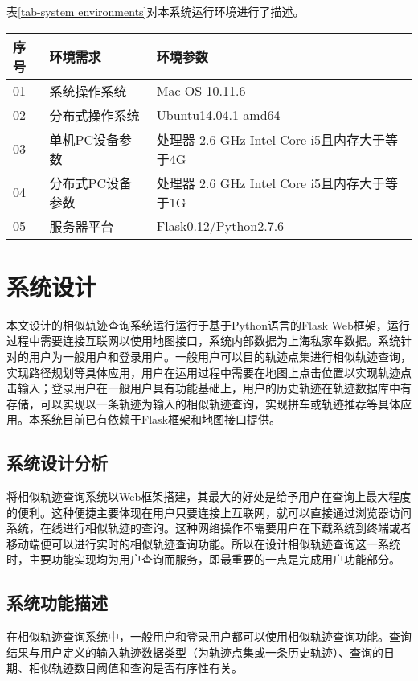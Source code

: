 表\ref{tab-system environments}对本系统运行环境进行了描述。
\begin{table}[!htpb]
  	\centering
		\begin{tabular}{ |p{1cm}|p{3.5cm}|p{8.5cm}| }
		\hline
		序号 & 环境需求 & 环境参数 \\
		\hline
		01 & 系统操作系统 & Mac OS 10.11.6  \\
		\hline
		02 & 分布式操作系统 & Ubuntu14.04.1 amd64  \\
		\hline
		03 & 单机PC设备参数 & 处理器 2.6 GHz Intel Core i5且内存大于等于4G\\
		\hline
		04 & 分布式PC设备参数 & 处理器 2.6 GHz Intel Core i5且内存大于等于1G\\
		\hline
		05 & 服务器平台 & Flask0.12/Python2.7.6 \\
		\hline
		\end{tabular}
\end{table}


\section{系统设计}
\label{sec:overall description}
本文设计的相似轨迹查询系统运行运行于基于Python语言的Flask Web框架，运行过程中需要连接互联网以使用地图接口，系统内部数据为上海私家车数据。系统针对的用户为一般用户和登录用户。一般用户可以目的轨迹点集进行相似轨迹查询，实现路径规划等具体应用，用户在运用过程中需要在地图上点击位置以实现轨迹点击输入；登录用户在一般用户具有功能基础上，用户的历史轨迹在轨迹数据库中有存储，可以实现以一条轨迹为输入的相似轨迹查询，实现拼车或轨迹推荐等具体应用。本系统目前已有依赖于Flask框架和地图接口提供。

\subsection{系统设计分析}
\label{subsec:system build requirement}
将相似轨迹查询系统以Web框架搭建，其最大的好处是给予用户在查询上最大程度的便利。这种便捷主要体现在用户只要连接上互联网，就可以直接通过浏览器访问系统，在线进行相似轨迹的查询。这种网络操作不需要用户在下载系统到终端或者移动端便可以进行实时的相似轨迹查询功能。所以在设计相似轨迹查询这一系统时，主要功能实现均为用户查询而服务，即最重要的一点是完成用户功能部分。

\subsection{系统功能描述}
\label{subsec:product functions}
在相似轨迹查询系统中，一般用户和登录用户都可以使用相似轨迹查询功能。查询结果与用户定义的输入轨迹数据类型（为轨迹点集或一条历史轨迹）、查询的日期、相似轨迹数目阈值和查询是否有序性有关。

